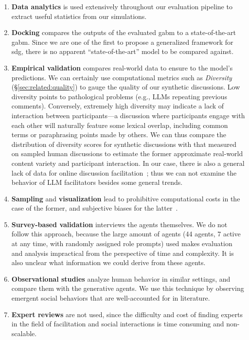 \begin{enumerate}
	\item \textbf{Data analytics} is used extensively throughout our evaluation pipeline to extract useful statistics from our simulations.
	
	\item \textbf{Docking} compares the outputs of the evaluated \ac{gabm} to a state-of-the-art \ac{gabm}. Since we are one of the first to propose a generalized framework for \ac{sdg}, there is no apparent ``state-of-the-art'' model to be compared against.
	
	\item \textbf{Empirical validation} compares real-world data to ensure to the model's predictions. We can certainly use computational metrics such as \textit{Diversity}~\cite{ulmer2024} (\S\ref{sec:related:quality}) to gauge the quality of our synthetic discussions. Low diversity points to pathological problems (e.g., LLMs repeating previous comments). Conversely, extremely high diversity may indicate a lack of interaction between participants---a discussion where participants engage with each other will naturally feature some lexical overlap, including common terms or paraphrasing points made by others. We can thus compare the distribution of diversity scores for synthetic discussions with that measured on sampled human discussions to estimate the former approximate real-world content variety and participant interaction. In our case, there is also a general lack of data for online discussion facilitation~\cite{korre2025evaluation}; thus we can not examine the behavior of LLM facilitators besides some general trends.
	
	\item \textbf{Sampling} and \textbf{visualization} lead to prohibitive computational costs in the case of the former, and subjective biases for the latter~\cite{adornetto2025_gabms}.
	
	\item \textbf{Survey-based validation} interviews the agents themselves. We do not follow this approach, because the large amount of agents (44 agents, 7 active at any time, with randomly assigned role prompts) used makes evaluation and analysis impractical from the perspective of time and complexity. It is also unclear what information we could derive from these agents.
	
	\item \textbf{Observational studies} analyze human behavior in similar settings, and compare them with the generative agents. We use this technique by observing emergent social behaviors that are well-accounted for in literature.
	
	\item \textbf{Expert reviews} are not used, since the difficulty and cost of finding experts in the field of facilitation and social interactions is time consuming and non-scalable. 
\end{enumerate}

